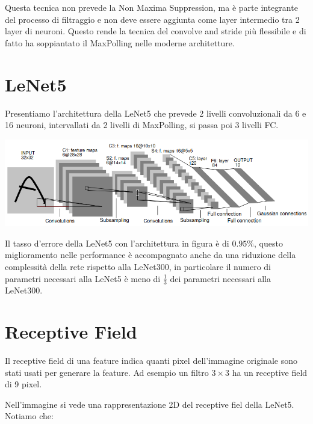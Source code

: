 Questa tecnica non prevede la Non Maxima Suppression, ma è parte integrante del processo di filtraggio e non deve essere aggiunta come layer intermedio tra 2 layer di neuroni. Questo rende la tecnica del convolve and stride più flessibile e di fatto ha soppiantato il MaxPolling nelle moderne architetture.

\section{LeNet5}
Presentiamo l'architettura della LeNet5 che prevede 2 livelli convoluzionali da 6 e 16 neuroni, intervallati da 2 livelli di MaxPolling, si passa poi 3 livelli FC. 
\begin{center}
	\includegraphics[width=.8\linewidth]{Picture/LeNet_5}
\end{center}
Il tasso d'errore della LeNet5 con l'architettura in figura è di $0.95\%$, questo miglioramento nelle performance è accompagnato anche da una riduzione della complessità della rete rispetto alla LeNet300, in particolare il numero di parametri necessari alla LeNet5 è meno di $\frac{1}{3}$ dei parametri necessari alla LeNet300.

\section{Receptive Field}
Il receptive field di una feature indica quanti pixel dell'immagine originale sono stati usati per generare la feature. Ad esempio un filtro $3\times3$ ha un receptive field di 9 pixel.

Nell'immagine si vede una rappresentazione 2D del receptive fiel della LeNet5. Notiamo che:

